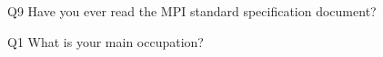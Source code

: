 \begin{description}%
\item{Q9} Have you ever read the MPI standard specification document?%
\item{Q1} What is your main occupation?%
\end{description}%
